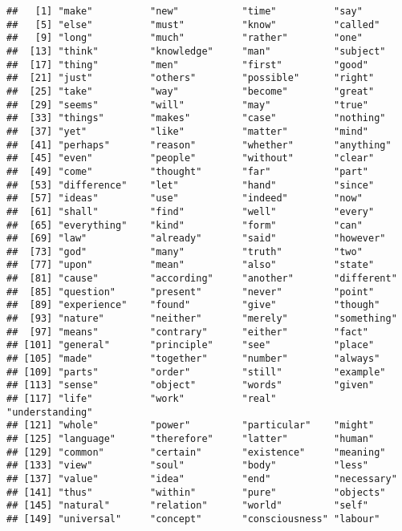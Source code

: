 \documentclass[
]{article}
\begin{document}
\begin{verbatim}
##   [1] "make"          "new"           "time"          "say"          
##   [5] "else"          "must"          "know"          "called"       
##   [9] "long"          "much"          "rather"        "one"          
##  [13] "think"         "knowledge"     "man"           "subject"      
##  [17] "thing"         "men"           "first"         "good"         
##  [21] "just"          "others"        "possible"      "right"        
##  [25] "take"          "way"           "become"        "great"        
##  [29] "seems"         "will"          "may"           "true"         
##  [33] "things"        "makes"         "case"          "nothing"      
##  [37] "yet"           "like"          "matter"        "mind"         
##  [41] "perhaps"       "reason"        "whether"       "anything"     
##  [45] "even"          "people"        "without"       "clear"        
##  [49] "come"          "thought"       "far"           "part"         
##  [53] "difference"    "let"           "hand"          "since"        
##  [57] "ideas"         "use"           "indeed"        "now"          
##  [61] "shall"         "find"          "well"          "every"        
##  [65] "everything"    "kind"          "form"          "can"          
##  [69] "law"           "already"       "said"          "however"      
##  [73] "god"           "many"          "truth"         "two"          
##  [77] "upon"          "mean"          "also"          "state"        
##  [81] "cause"         "according"     "another"       "different"    
##  [85] "question"      "present"       "never"         "point"        
##  [89] "experience"    "found"         "give"          "though"       
##  [93] "nature"        "neither"       "merely"        "something"    
##  [97] "means"         "contrary"      "either"        "fact"         
## [101] "general"       "principle"     "see"           "place"        
## [105] "made"          "together"      "number"        "always"       
## [109] "parts"         "order"         "still"         "example"      
## [113] "sense"         "object"        "words"         "given"        
## [117] "life"          "work"          "real"          "understanding"
## [121] "whole"         "power"         "particular"    "might"        
## [125] "language"      "therefore"     "latter"        "human"        
## [129] "common"        "certain"       "existence"     "meaning"      
## [133] "view"          "soul"          "body"          "less"         
## [137] "value"         "idea"          "end"           "necessary"    
## [141] "thus"          "within"        "pure"          "objects"      
## [145] "natural"       "relation"      "world"         "self"         
## [149] "universal"     "concept"       "consciousness" "labour"
\end{verbatim}
\end{document}
